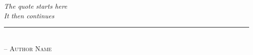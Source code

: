 \chapter*{~}

\begin{center}                      %
\vspace*{2.5in}                     %
    \begin{onehalfspacing}
    \textit{
    The quote starts here \\
    It then continues
    } \\
    
    \rule{1.5in}{0.5pt} \\          %
    
    \textsc{-- Author Name}
\end{onehalfspacing}
\end{center}